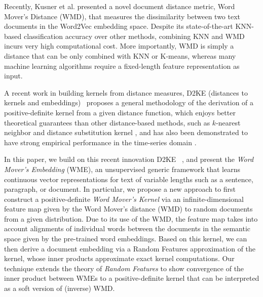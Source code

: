 \documentclass[11pt,a4paper]{article}
\newcommand{\1}{\boldsymbol{1}}
\begin{document}
Recently, Kusner et al. \cite{kusner2015word} presented a novel document distance metric, Word Mover's Distance (WMD), that measures the dissimilarity between two text documents in the Word2Vec embedding space.
Despite its state-of-the-art KNN-based classification accuracy over other methods, combining KNN and WMD incurs very high computational cost. More importantly, WMD is simply a distance that can be only combined with KNN or K-means, whereas many machine learning algorithms require a fixed-length feature representation as input.  

A recent work in building kernels from distance measures, D2KE (distances to kernels and embeddings)~\cite{wu2018d2ke} proposes a general methodology of the derivation of a positive-definite kernel from a given distance function, which enjoys better theoretical guarantees than other distance-based methods, such as $k$-nearest neighbor and distance substitution kernel \cite{haasdonk2004learning}, and has also been demonstrated to have strong empirical performance in the time-series domain \cite{wu2018random}. 

In this paper, we build on this recent innovation D2KE ~\cite{wu2018d2ke}, and present the \emph{Word Mover's Embedding} (WME), an unsupervised generic framework that learns continuous vector representations for text of variable lengths such as a sentence, paragraph, or document. In particular, we propose a new approach to first construct a positive-definite \emph{Word Mover's Kernel} via an infinite-dimensional feature map given by the Word Mover's distance (WMD) to random documents from a given distribution. Due to its use of the WMD, the feature map takes into account alignments of individual words between the documents in the semantic space given by the pre-trained word embeddings. Based on this kernel, we can then derive a document embedding via a Random Features approximation of the kernel, whose inner products approximate exact kernel computations. Our technique extends the theory of \emph{Random Features} to show convergence of the inner product between WMEs to a positive-definite kernel that can be interpreted as a soft version of (inverse) WMD. 
\end{document}
